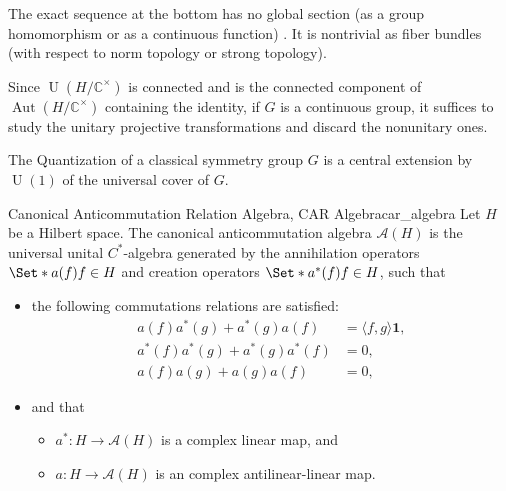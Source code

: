 \documentclass{article}
\begin{document}
The exact sequence at the bottom has no global section (as a group homomorphism or as a continuous function) \cite{IntroCFT}.
It is nontrivial as fiber bundles (with respect to norm topology or strong topology).

Since $\operatorname{U}(H/\mathbb{C}^\times)$ is connected and is the connected component of $\operatorname{Aut}(H/\mathbb{C}^\times)$ containing the identity, if $G$ is a continuous group, it suffices to study the unitary projective transformations and discard the nonunitary ones.

The Quantization of a classical symmetry group $G$ is a central extension by $\operatorname{U}(1)$ of the universal cover of $G$.

\begin{definition}{Canonical Anticommutation Relation Algebra, CAR Algebra}{car_algebra}
    Let $H$ be a Hilbert space.
    The canonical anticommutation algebra $\mathscr{A}(H)$ is the universal unital $C^*$-algebra generated by the annihilation operators $\Set*{a(f)}{f\in H}$ and creation operators $\Set*{a^*(f)}{f\in H}$, such that
    \begin{itemize}
        \item the following commutations relations are satisfied:
        \begin{align*}
            a(f) a^*(g) + a^*(g) a(f) &= \langle f,g \rangle \mathbf{1}, \\
            a^*(f) a^*(g) + a^*(g) a^*(f) &= 0, \\
            a(f) a(g) + a(g) a(f) &= 0,
        \end{align*}
        \item and that
        \begin{itemize}
            \item $a^*: H \rightarrow \mathscr{A}(H)$ is a complex linear map, and
            \item $a: H \rightarrow \mathscr{A}(H)$ is an complex antilinear-linear map.
        \end{itemize}
    \end{itemize}
\end{definition}
\end{document}
